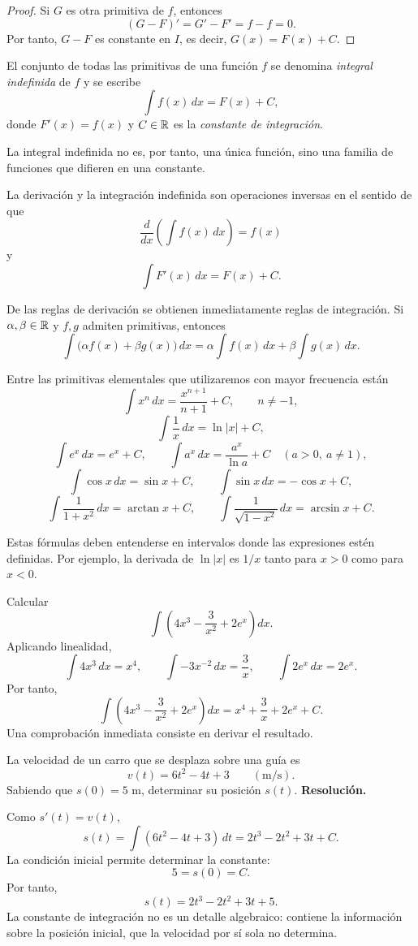 \begin{proof}
Si $G$ es otra primitiva de $f$, entonces
\[
(G-F)'=G'-F'=f-f=0.
\]
Por tanto, $G-F$ es constante en $I$, es decir, $G(x)=F(x)+C$.
\end{proof}

\begin{definition}
El conjunto de todas las primitivas de una función $f$ se denomina \emph{integral indefinida} de $f$ y se escribe
\[
\int f(x)\,dx=F(x)+C,
\]
donde $F'(x)=f(x)$ y $C\in\mathbb{R}$ es la \emph{constante de integración}.
\end{definition}

La integral indefinida no es, por tanto, una única función, sino una familia de funciones que difieren en una constante.

La derivación y la integración indefinida son operaciones inversas en el sentido de que
\[
\frac{d}{dx}\left(\int f(x)\,dx\right)=f(x)
\]
y
\[
\int F'(x)\,dx=F(x)+C.
\]

De las reglas de derivación se obtienen inmediatamente reglas de integración. Si $\alpha,\beta\in\mathbb{R}$ y $f,g$ admiten primitivas, entonces
\[
\int \bigl(\alpha f(x)+\beta g(x)\bigr)\,dx
=
\alpha\int f(x)\,dx+\beta\int g(x)\,dx.
\]

Entre las primitivas elementales que utilizaremos con mayor frecuencia están
\[
\int x^n\,dx=\frac{x^{n+1}}{n+1}+C,\qquad n\neq-1,
\]
\[
\int \frac1x\,dx=\ln|x|+C,
\]
\[
\int e^x\,dx=e^x+C,
\qquad
\int a^x\,dx=\frac{a^x}{\ln a}+C\quad (a>0,\ a\neq1),
\]
\[
\int \cos x\,dx=\sin x+C,
\qquad
\int \sin x\,dx=-\cos x+C,
\]
\[
\int \frac{1}{1+x^2}\,dx=\arctan x+C,
\qquad
\int \frac{1}{\sqrt{1-x^2}}\,dx=\arcsin x+C.
\]

Estas fórmulas deben entenderse en intervalos donde las expresiones estén definidas. Por ejemplo, la derivada de $\ln|x|$ es $1/x$ tanto para $x>0$ como para $x<0$.

\begin{example}
Calcular
\[
\int \left(4x^3-\frac{3}{x^2}+2e^x\right)dx.
\]
Aplicando linealidad,
\[
\int4x^3\,dx=x^4,
\qquad
\int -3x^{-2}\,dx=\frac{3}{x},
\qquad
\int2e^x\,dx=2e^x.
\]
Por tanto,
\[
\boxed{\int \left(4x^3-\frac{3}{x^2}+2e^x\right)dx
=x^4+\frac3x+2e^x+C.}
\]
Una comprobación inmediata consiste en derivar el resultado.
\end{example}

\begin{solvedexercise}
La velocidad de un carro que se desplaza sobre una guía es
\[
v(t)=6t^2-4t+3\qquad (\mathrm{m/s}).
\]
Sabiendo que $s(0)=5$ m, determinar su posición $s(t)$.
\tcblower
\textbf{Resolución.}\par\smallskip
Como $s'(t)=v(t)$,
\[
s(t)=\int(6t^2-4t+3)\,dt
=2t^3-2t^2+3t+C.
\]
La condición inicial permite determinar la constante:
\[
5=s(0)=C.
\]
Por tanto,
\[
\boxed{s(t)=2t^3-2t^2+3t+5.}
\]
La constante de integración no es un detalle algebraico: contiene la información sobre la posición inicial, que la velocidad por sí sola no determina.
\end{solvedexercise}

